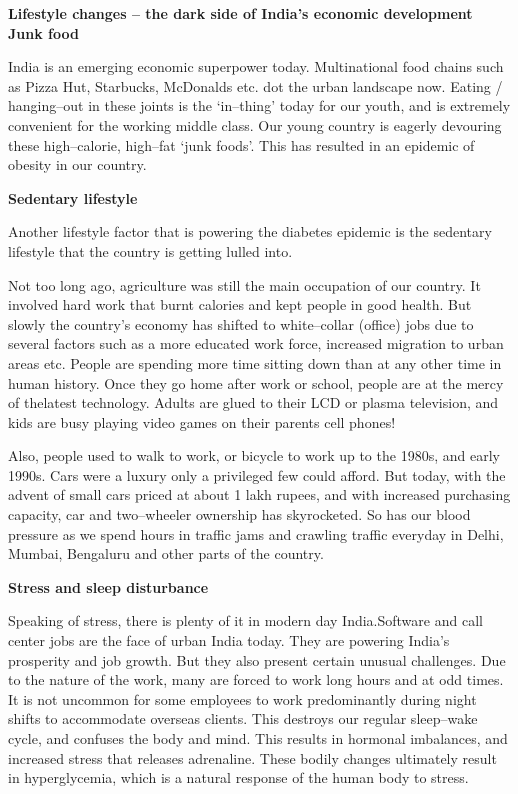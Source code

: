 \textbf{Lifestyle changes – the dark side of India’s economic development Junk food}

India is an emerging economic superpower today. Multinational food chains such as Pizza Hut, Starbucks, McDonalds etc. dot the urban landscape now. Eating / hanging–out in these joints is the ‘in–thing’ today for our youth, and is extremely convenient for the working mi\-ddle class. Our young country is eagerly devouring these high–calorie, high–fat ‘junk foods’. This has resulted in an epidemic of obesity in our country.

\noindent\textbf{Sedentary lifestyle}

Another lifestyle factor that is powering the diabetes epidemic is the sedentary lifestyle that the country is getting lulled into.

Not too long ago, agriculture was still the main occupation of our country. It involved hard work that burnt calories and kept people in good health. But slowly the country’s economy has shifted to white–collar (office) jobs due to several factors such as a more educated work force, increased migration to urban areas etc. People are spending more time sitting down than at any other time in human history. Once they go home after work or school, people are at the mercy of the\break latest technology. Adults are glued to their LCD or plasma television, and kids are busy playing video games on their parents cell phones!

Also, people used to walk to work, or bicycle to work up to the 1980s, and early 1990s. Cars were a luxury only a privileged few could afford. But today, with the advent of small cars priced at about 1 lakh rupees, and with increased purchasing capacity, car and two–wheeler ownership has skyrocketed. So has our blood pressure as we spend hours in traffic jams and crawling traffic everyday in Delhi, Mumbai, Bengaluru and other parts of the country.
 
 \clearpage
\noindent\textbf{Stress and sleep disturbance}

\vskip 8pt
Speaking of stress, there is plenty of it in modern day India.\break Software and call center jobs are the face of urban India today. They are powering India’s prosperity and job growth. But they also present certain unusual challenges. Due to the nature of the work, many are forced to work long hours and at odd times. It is not uncommon for some employees to work predominantly during night shifts to acco\-mmodate overseas clients. This destroys our regular sleep–wake cycle, and confuses the body and mind. This results in hormonal imbalances, and increased stress that releases adrenaline. These bodily changes ultimately result in hyperglycemia, which is a natural response of the human body to stress.

